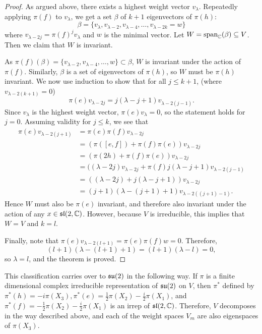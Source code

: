 \documentclass[a4paper]{article}
\begin{document}
\begin{proof}
    As argued above, there exists a highest weight vector $v_{\lambda}$. Repeatedly applying $\pi(f)$ to $v_{\lambda}$, we get a set $\beta$ of $k+1$ eigenvectors of $\pi(h)$:
    $$\beta = \{v_{\lambda}, v_{\lambda -2}, v_{\lambda -4}, \hdots, v_{\lambda - 2k} = w\}$$ 
    where $v_{\lambda -2j} = \pi(f)^j v_{\lambda}$ and $w$ is the minimal vector. Let $W = \text{span}_{\mathbb{C}}(\beta) \subseteq V$. Then we claim that $W$ is invariant.

    As $\pi(f)(\beta) = \{v_{\lambda -2}, v_{\lambda -4}, \hdots, w\} \subset \beta$, $W$ is invariant under the action of $\pi(f)$. Similarly, $\beta$ is a set of eigenvectors of $\pi(h)$, so $W$ must be $\pi(h)$ invariant. We now use induction to show that for all $j \leq k + 1$, (where $v_{\lambda - 2(k+1)} = 0$)
    $$\pi(e)v_{\lambda - 2j} = j(\lambda-j+1)v_{\lambda - 2(j-1)}.$$ 
    Since $v_{\lambda}$ is the highest weight vector, $\pi(e)v_{\lambda} = 0$, so the statement holds for $j=0$. Assuming validity for $j \leq k$, we see that 
    \begin{align*}
        \pi(e) v_{\lambda-2(j+1)} &= \pi(e) \pi(f) v_{\lambda-2 j} \\
            &=(\pi([e, f])+\pi(f) \pi(e)) v_{\lambda-2 j} \\
            &=(\pi(2 h)+\pi(f) \pi(e)) v_{\lambda-2 j} \\
            &=((\lambda-2 j) v_{\lambda-2 j}+\pi(f) j(\lambda-j+1) v_{\lambda-2(j-1)}\\
            &=((\lambda-2 j)+j(\lambda-j+1)) v_{\lambda-2 j} \\
            &=(j+1)(\lambda-(j+1)+1) v_{\lambda-2((j+1)-1)}.
    \end{align*}
    Hence $W$ must also be $\pi(e)$ invariant, and therefore also invariant under the action of any $x \in \mathfrak{sl}(2, \mathbb{C})$. However, because $V$ is irreducible, this implies that $W=V$ and $k=l$.

    Finally, note that $\pi(e)v_{\lambda-2(l+1)} = \pi(e)\pi(f)w = 0$. Therefore, $$(l + 1)(\lambda-(l+1)+1) = (l + 1)(\lambda-l) = 0,$$
    so $\lambda = l$, and the theorem is proved.
\end{proof}

This classification carries over to $\mathfrak{su}(2)$ in the following way. If $\pi$ is a finite dimensional complex irreducible representation of $\mathfrak{su}(2)$ on $V$, then $\pi^*$ defined by $\pi^*({h}) = -i\pi(X_3), \pi^*({e}) = \frac{1}{2}\pi(X_2) - \frac{i}{2}\pi(X_1)$, and $\pi^*({f}) = -\frac{1}{2}\pi(X_2) - \frac{i}{2}\pi(X_1)$ is an irrep of $\mathfrak{sl}(2, \mathbb{C})$. Therefore, $V$ decomposes in the way described above, and each of the weight spaces $V_m$ are also eigenspaces of $\pi(X_3)$.
\end{document}
